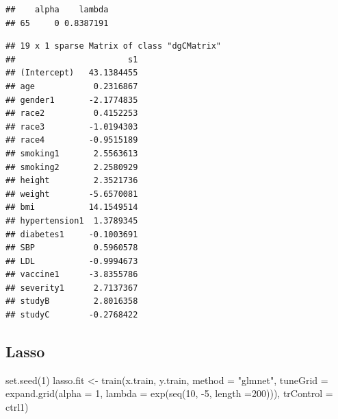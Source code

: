 \documentclass[
]{article}
\newenvironment{Shaded}{\begin{snugshade}}{\end{snugshade}}
\newcommand{\AttributeTok}[1]{\textcolor[rgb]{0.77,0.63,0.00}{#1}}
\newcommand{\CommentTok}[1]{\textcolor[rgb]{0.56,0.35,0.01}{\textit{#1}}}
\newcommand{\DecValTok}[1]{\textcolor[rgb]{0.00,0.00,0.81}{#1}}
\newcommand{\FunctionTok}[1]{\textcolor[rgb]{0.00,0.00,0.00}{#1}}
\newcommand{\NormalTok}[1]{#1}
\newcommand{\OtherTok}[1]{\textcolor[rgb]{0.56,0.35,0.01}{#1}}
\newcommand{\SpecialCharTok}[1]{\textcolor[rgb]{0.00,0.00,0.00}{#1}}
\newcommand{\StringTok}[1]{\textcolor[rgb]{0.31,0.60,0.02}{#1}}
\begin{document}
\begin{verbatim}
##    alpha    lambda
## 65     0 0.8387191
\end{verbatim}

\begin{Shaded}
\end{Shaded}

\begin{verbatim}
## 19 x 1 sparse Matrix of class "dgCMatrix"
##                       s1
## (Intercept)   43.1384455
## age            0.2316867
## gender1       -2.1774835
## race2          0.4152253
## race3         -1.0194303
## race4         -0.9515189
## smoking1       2.5563613
## smoking2       2.2580929
## height         2.3521736
## weight        -5.6570081
## bmi           14.1549514
## hypertension1  1.3789345
## diabetes1     -0.1003691
## SBP            0.5960578
## LDL           -0.9994673
## vaccine1      -3.8355786
## severity1      2.7137367
## studyB         2.8016358
## studyC        -0.2768422
\end{verbatim}

\hypertarget{lasso}{%
\subsection{Lasso}\label{lasso}}

\begin{Shaded}
\begin{Highlighting}[]
\FunctionTok{set.seed}\NormalTok{(}\DecValTok{1}\NormalTok{)}
\NormalTok{lasso.fit }\OtherTok{\textless{}{-}} \FunctionTok{train}\NormalTok{(x.train, y.train,}
                   \AttributeTok{method =} \StringTok{"glmnet"}\NormalTok{,}
                   \AttributeTok{tuneGrid =} \FunctionTok{expand.grid}\NormalTok{(}\AttributeTok{alpha =} \DecValTok{1}\NormalTok{, }
                                          \AttributeTok{lambda =} \FunctionTok{exp}\NormalTok{(}\FunctionTok{seq}\NormalTok{(}\DecValTok{10}\NormalTok{, }\SpecialCharTok{{-}}\DecValTok{5}\NormalTok{, }\AttributeTok{length =}\DecValTok{200}\NormalTok{))),}
                   \AttributeTok{trControl =}\NormalTok{ ctrl1)}
\end{Highlighting}
\end{Shaded}
\end{document}
